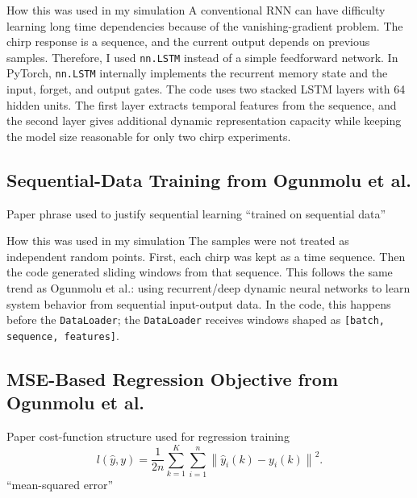 \documentclass[11pt]{article}
\begin{document}
\begin{implementationbox}{How this was used in my simulation}
A conventional RNN can have difficulty learning long time dependencies because of the vanishing-gradient problem. The chirp response is a sequence, and the current output depends on previous samples. Therefore, I used \texttt{nn.LSTM} instead of a simple feedforward network. In PyTorch, \texttt{nn.LSTM} internally implements the recurrent memory state and the input, forget, and output gates. The code uses two stacked LSTM layers with 64 hidden units. The first layer extracts temporal features from the sequence, and the second layer gives additional dynamic representation capacity while keeping the model size reasonable for only two chirp experiments.
\end{implementationbox}

\subsection{Sequential-Data Training from Ogunmolu et al.}
\begin{paperbox}{Paper phrase used to justify sequential learning \cite{ogunmolu2016}}
\centering
``trained on sequential data''
\end{paperbox}

\begin{implementationbox}{How this was used in my simulation}
The samples were not treated as independent random points. First, each chirp was kept as a time sequence. Then the code generated sliding windows from that sequence. This follows the same trend as Ogunmolu et al.: using recurrent/deep dynamic neural networks to learn system behavior from sequential input-output data. In the code, this happens before the \texttt{DataLoader}; the \texttt{DataLoader} receives windows shaped as \texttt{[batch, sequence, features]}.
\end{implementationbox}

\subsection{MSE-Based Regression Objective from Ogunmolu et al.}
\begin{paperbox}{Paper cost-function structure used for regression training \cite{ogunmolu2016}}
\begin{equation}
 l(\hat{y},y)=\frac{1}{2n}\sum_{k=1}^{K}\sum_{i=1}^{n}\left\|\hat{y}_i(k)-y_i(k)\right\|^2.
\end{equation}
\centering
``mean-squared error''
\end{paperbox}
\end{document}
